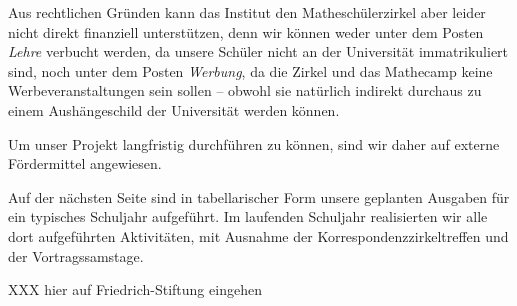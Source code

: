\documentclass[12pt]{zettel}
\begin{document}
Aus rechtlichen Gründen kann das Institut den Matheschülerzirkel aber leider nicht
direkt finanziell unterstützen, denn wir können weder unter dem Posten
\emph{Lehre} verbucht werden, da unsere Schüler nicht an der Universität
immatrikuliert sind, noch unter dem Posten \emph{Werbung}, da die Zirkel und
das Mathecamp keine Werbeveranstaltungen sein sollen -- obwohl sie natürlich indirekt
durchaus zu einem Aushängeschild der Universität werden können.

Um unser Projekt langfristig durchführen zu können, sind wir daher auf externe
Fördermittel angewiesen.

Auf der nächsten Seite sind in tabellarischer Form unsere geplanten Ausgaben für ein
typisches Schuljahr aufgeführt. Im laufenden Schuljahr realisierten wir alle
dort aufgeführten Aktivitäten, mit Ausnahme der Korrespondenzzirkeltreffen und
der Vortragssamstage.

XXX hier auf Friedrich-Stiftung eingehen
\end{document}

